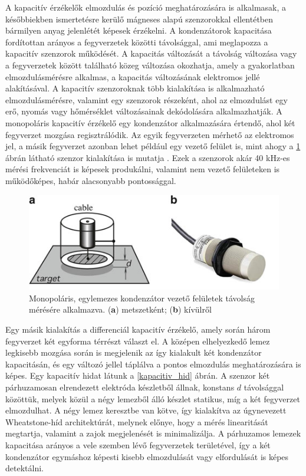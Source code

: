 A kapacitív érzékelők elmozdulás és pozíció meghatározására is alkalmasak, a későbbiekben ismertetésre kerülő mágneses alapú szenzorokkal ellentétben bármilyen anyag jelenlétét képesek érzékelni.
A kondenzátorok kapacitása fordítottan arányos a fegyverzetek közötti távolsággal, ami meglapozza a kapacitív szenzorok működését. A kapacitás változását a távolság változása vagy a fegyverzetek között található közeg változása okozhatja, amely a gyakorlatban elmozdulásmérésre alkalmas, a kapacitás változásának elektromos jellé alakításával.
A kapacitív szenzoroknak több kialakítása is alkalmazható elmozdulásmérésre, valamint egy szenzorok részeként, ahol az elmozdulást egy erő, nyomás vagy hőmérséklet változásainak dekódolására alkalmazhatják.
A monopoláris kapacitív érzékelő egy kondenzátor alkalmazására értendő, ahol két fegyverzet mozgása regisztrálódik. Az egyik fegyverzeten mérhető az elektromos jel, a másik fegyverzet azonban lehet például egy vezető felület is, mint ahogy a \ref{kapacitiv_kabel} ábrán látható szenzor kialakítása is mutatja \cite{Fraden2016a}. Ezek a szenzorok akár 40 kHz-es mérési frekvenciát is képesek produkálni, valamint nem vezető felületeken is működőképes, habár alacsonyabb pontossággal.
\begin{figure}
	\centering
	\includegraphics{figures/kapacitiv_szenzor_kabeles.png}
	\caption{Monopoláris, egylemezes kondenzátor vezető felületek távolság mérésére alkalmazva. (\textbf{a}) metszetként; (\textbf{b}) kívülről}
	\label{kapacitiv_kabel}
\end{figure}
Egy másik kialakítás a differenciál kapacitív érzékelő, amely során három fegyverzet két egyforma térrészt választ el. A középen elhelyezkedő lemez legkisebb mozgása során is megjelenik az így kialakult két kondenzátor kapacitásán, és egy változó jellel táplálva a pontos elmozdulás meghatározására is képes.
Egy kapacitív hidat látunk a \ref{kapacitiv_hid} ábrán. A szenzor két párhuzamosan elrendezett elektróda készletből állnak, konstans $d$ távolsággal közöttük, melyek közül a négy lemezből álló készlet statikus, míg a két fegyverzet elmozdulhat. A négy lemez keresztbe van kötve, így kialakítva az úgynevezett Wheatstone-híd architektúrát, melynek előnye, hogy a mérés linearitását megtartja, valamint a zajok megjelenését is minimalizálja. A párhuzamos lemezek kapacitása arányos a vele szemben lévő fegyverzetek területével, így a két kondenzátor egymáshoz képesti kisebb elmozdulását vagy elfordulását is képes detektálni. 

